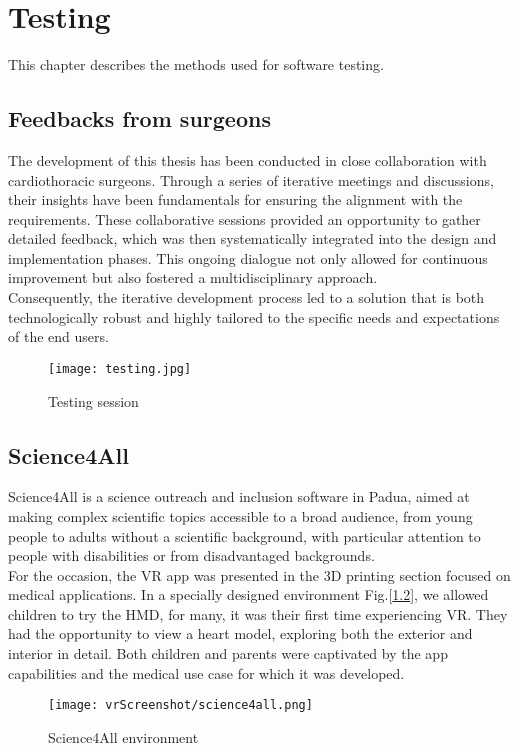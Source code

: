 \chapter{Testing}
\label{chp:testing}
\noindent
This chapter describes the methods used for software testing.

\section{Feedbacks from surgeons}
\noindent
The development of this thesis has been conducted in close collaboration with cardiothoracic surgeons.
Through a series of iterative meetings and discussions, their insights have been fundamentals for ensuring the alignment with the requirements.
These collaborative sessions provided an opportunity to gather detailed feedback, which was then systematically integrated into the design and implementation phases.
This ongoing dialogue not only allowed for continuous improvement but also fostered a multidisciplinary approach.\\
Consequently, the iterative development process led to a solution that is both technologically robust and highly tailored to the specific needs and expectations of the end users.

\begin{figure}[ht]
  \centering
  \texttt{[image: testing.jpg]}
  \caption{Testing session}
  \label{fig:testing}
\end{figure}

\section{Science4All}
\noindent
Science4All is a science outreach and inclusion software in Padua, aimed at making complex scientific topics accessible to a broad audience,
from young people to adults without a scientific background, with particular attention to people with disabilities or from disadvantaged backgrounds.\\
For the occasion, the \ac{VR} app was presented in the 3D printing section focused on medical applications. In a specially designed environment Fig.[\ref{fig:science4all}], we allowed children to try the \ac{HMD}, for many, it was their first time experiencing \ac{VR}. They had the opportunity to view a heart model, exploring both the exterior and interior in detail.
Both children and parents were captivated by the app capabilities and the medical use case for which it was developed.

\begin{figure}[ht]
  \centering
  \texttt{[image: vrScreenshot/science4all.png]}
  \caption{Science4All environment}
  \label{fig:science4all}
\end{figure}